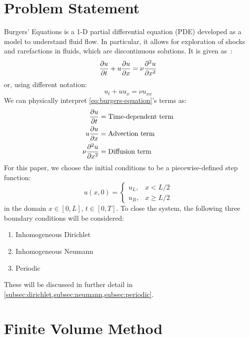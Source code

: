 \documentclass[11pt, letterpaper]{article}
\numberwithin{equation}{section}
\begin{document}
	\section{Problem Statement} \label{sec:problem-statement}
	Burgers' Equations is a 1-D partial differential equation (PDE) developed as a model to understand fluid flow.
	In particular, it allows for exploration of shocks and rarefactions in fluids, which are discontinuous solutions.
	It is given as~\cite{salihBurgersEquation2016}:
	\begin{equation}
		\label{eq:burgers-equation}
		\pdv{u}{t} + u\pdv{u}{x} = \nu \pdv[2]{u}{x}
	\end{equation}
	or, using different notation:
	\begin{equation}
		\label{eq:alternate-burgers-equation}
		u_t + uu_x=\nu u_{xx}
	\end{equation}
	We can physically interpret \cref{eq:burgers-equation}'s terms as:
	\begin{equation*}
		\begin{split}
			\pdv{u}{t}&=\text{Time-dependent term}\\
			u\pdv{u}{x}&=\text{Advection term}\\
			\nu \pdv[2]{u}{x}&=\text{Diffusion term}
		\end{split}
	\end{equation*}
	For this paper, we choose the initial conditions to be a piecewise-defined step function:
	\begin{equation}
		\label{eq:initial-condition}
		u(x,0)=\begin{cases}
				   u_L, & x<L/2\\
				   u_R, & x\geq L/2
		\end{cases}
	\end{equation}
	in the domain $x\in [0,L]$, $t\in[0,T]$.
	To close the system, the following three boundary conditions will be considered:
	\begin{enumerate}
		\item Inhomogeneous Dirichlet
		\item Inhomogeneous Neumann
		\item Periodic
	\end{enumerate}
	These will be discussed in further detail in \cref{subsec:dirichlet,subsec:neumann,subsec:periodic}.


	\section{Finite Volume Method}\label{sec:finite-volume-method}
	
\end{document}

